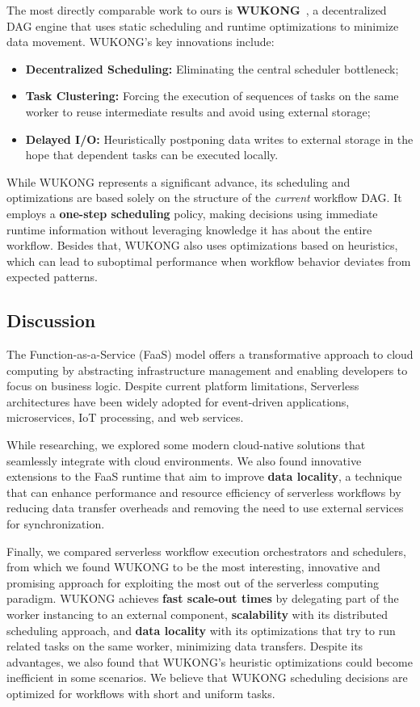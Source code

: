 \documentclass[conference]{IEEEtran}
\begin{document}
The most directly comparable work to ours is \textbf{WUKONG}~\cite{wukong_2}, a decentralized DAG engine that uses static scheduling and runtime optimizations to minimize data movement. WUKONG's key innovations include:
\begin{itemize}
    \item \textbf{Decentralized Scheduling:} Eliminating the central scheduler bottleneck;
    \item \textbf{Task Clustering:} Forcing the execution of sequences of tasks on the same worker to reuse intermediate results and avoid using external storage;
    \item \textbf{Delayed I/O:} Heuristically postponing data writes to external storage in the hope that dependent tasks can be executed locally.
\end{itemize}

While WUKONG represents a significant advance, its scheduling and optimizations are based solely on the structure of the \textit{current} workflow DAG. It employs a \textbf{one-step scheduling} policy, making decisions using immediate runtime information without leveraging knowledge it has about the entire workflow. Besides that, WUKONG also uses optimizations based on heuristics, which can lead to suboptimal performance when workflow behavior deviates from expected patterns.

\subsection{Discussion}
The Function-as-a-Service (FaaS) model offers a transformative approach to cloud computing by abstracting infrastructure management and enabling developers to focus on business logic. Despite current platform limitations, Serverless architectures have been widely adopted for event-driven applications, microservices, IoT processing, and web services.

While researching, we explored some modern cloud-native solutions that seamlessly integrate with cloud environments. We also found innovative extensions to the FaaS runtime that aim to improve \textbf{data locality}, a technique that can enhance performance and resource efficiency of serverless workflows by reducing data transfer overheads and removing the need to use external services for synchronization.

Finally, we compared serverless workflow execution orchestrators and schedulers, from which we found WUKONG to be the most interesting, innovative and promising approach for exploiting the most out of the serverless computing paradigm. WUKONG achieves \textbf{fast scale-out times} by delegating part of the worker instancing to an external component, \textbf{scalability} with its distributed scheduling approach, and \textbf{data locality} with its optimizations that try to run related tasks on the same worker, minimizing data transfers. Despite its advantages, we also found that WUKONG's heuristic optimizations could become inefficient in some scenarios. We believe that WUKONG scheduling decisions are optimized for workflows with short and uniform tasks.
\end{document}
